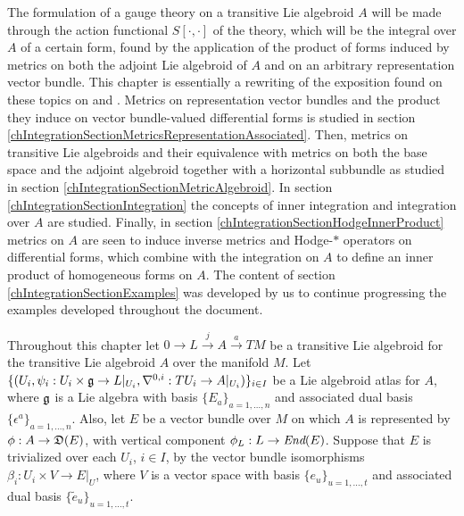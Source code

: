 The formulation of a gauge theory on a transitive Lie algebroid $A$ will be made through the action functional $S[\cdot, \cdot]$ of the theory, which will be the %
integral over $A$ of a certain form, found by the application of the product of forms induced by metrics on both the adjoint Lie algebroid of $A$ and on an arbitrary representation vector bundle.
This chapter is essentially a rewriting of the exposition found on these topics on \cite{Fournel2011} and \cite{Fournel2013}. Metrics on representation vector bundles and the product they induce on vector bundle-valued differential forms is studied in section \ref{chIntegrationSectionMetricsRepresentationAssociated}. Then, metrics on transitive Lie algebroids and their equivalence with metrics on both the base space and the adjoint algebroid together with a horizontal subbundle as studied in section \ref{chIntegrationSectionMetricAlgebroid}. In section \ref{chIntegrationSectionIntegration} the concepts of inner integration and integration over $A$ are studied. Finally, in section \ref{chIntegrationSectionHodgeInnerProduct} metrics on $A$ are seen to induce inverse metrics and Hodge-$*$ operators on differential forms, which combine with the integration on $A$ to define an inner product of homogeneous forms on $A$. The content of section \ref{chIntegrationSectionExamples} was developed by us to continue progressing the examples developed throughout the document.

Throughout this chapter let $0 \to L \xrightarrow{j} A \xrightarrow{a} TM$ be a transitive Lie algebroid for the transitive Lie algebroid $A$ over the manifold $M$.
Let $\{(U_i, \psi_i: U_i \times \mathfrak{g} \to L|_{U_i}, \nabla^{0, i}: TU_i \to A|_{U_i})\}_{i \in I}$ be a Lie algebroid atlas for $A$, where $\mathfrak{g}$ is a Lie algebra with basis $\{E_a\}_{a = 1, \dots, n}$ and associated dual basis $\{\epsilon^a\}_{a = 1, \dots, n}$.
Also, let $E$ be a vector bundle over $M$ on which $A$ is represented by $\phi: A \to \alg D(E)$, with vertical component $\phi_L: L \to \End(E)$. Suppose that $E$ is trivialized over each $U_i$, $i \in I$, by the vector bundle isomorphisms $\beta_i: U_i \times V \to E|_U$, where $V$ is a vector space with basis $\{e_u\}_{u = 1, \dots, t}$ and associated dual basis $\{\tilde e_u\}_{u = 1, \dots, t}$.

